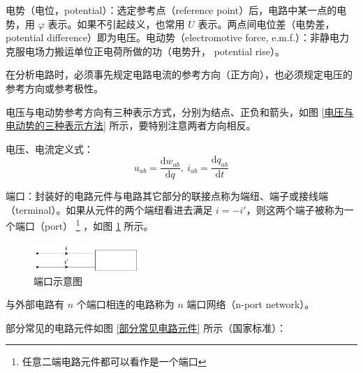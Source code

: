 \documentclass[UTF8]{report}
\theoremstyle{MyLineTheoremStyle} %
\theoremstyle{MyBlockTheoremStyle} %
\theoremstyle{MySubsubsectionStyle} %
\begin{document}
电势（电位，potential）：选定参考点（reference point）后，电路中某一点的电势，用 $\varphi$ 表示。如果不引起歧义，也常用 $U$ 表示。两点间电位差（电势差，potential difference）即为电压。电动势（electromotive force, e.m.f.）：非静电力克服电场力搬运单位正电荷所做的功（电势升， potential rise）。

在分析电路时，必须事先规定电路电流的参考方向（正方向），也必须规定电压的参考方向或参考极性。

电压与电动势参考方向有三种表示方式，分别为结点、正负和箭头，如图 \ref{电压与电动势的三种表示方法} 所示，要特别注意两者方向相反。

电压、电流定义式：
\begin{equation}
u_{ab} = \frac{\mathrm{d} w_{ab}}{\mathrm{d}q},\ i_{ab} = \frac{\mathrm{d} q_{ab}}{\mathrm{d}t}
\end{equation}



端口：封装好的电路元件与电路其它部分的联接点称为端纽、端子或接线端（terminal）。如果从元件的两个端纽看进去满足 $i = -i'$，则这两个端子被称为一个端口（port）
\footnote{任意二端电路元件都可以看作是一个端口}
，如图 \ref{端口示意图} 所示。

\begin{figure}[H]\centering
\includegraphics[width=0.35\textwidth]{assets/1,2/端口.drawio.pdf}
\caption{端口示意图}\label{端口示意图}
\end{figure}

与外部电路有 $n$ 个端口相连的电路称为 $n$ 端口网络（n-port network）。

部分常见的电路元件如图 \ref{部分常见电路元件} 所示（国家标准）：
\end{document}
